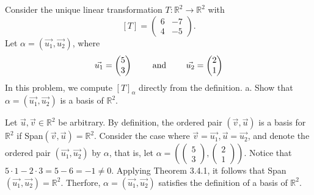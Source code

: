 \documentclass[12pt]{article}
\newenvironment{problem}[2][Problem]
{
	\begin{trivlist} 
		\item[\hskip \labelsep {\bfseries #1 #2:}]
	}
{
	\end{trivlist}
	}
\newenvironment{solution}[1][Solution]
{
	\begin{trivlist} 
		\item[\hskip \labelsep {\itshape #1:}]
	}
	{
	\end{trivlist}
}
\begin{document}
\begin{problem}{1}
Consider the unique linear transformation $T:\mathbb{R}^2 \to \mathbb{R}^2$ with
\[
[T]=\begin{pmatrix}6&-7\\4&-5\end{pmatrix}\text{.}
\]
Let $\alpha=(\vec{u_{1}},\vec{u_{2}})$, where
\[
\vec{u_{1}}=\begin{pmatrix}5\\3\end{pmatrix} \hphantom{1000} \text{ and } \hphantom{1000} \vec{u_{2}}=\begin{pmatrix}2\\1\end{pmatrix}
\]
In this problem, we compute $[T]_{\alpha}$ directly from the definition.
\noindent
\newline
\newline
a. Show that $\alpha=(\vec{u_{1}},\vec{u_{2}})$ is a basis of $\mathbb{R}^2$.
\begin{solution}
Let $\vec{u},\vec{v} \in \mathbb{R}^2$ be arbitrary.
By definition, the ordered pair $(\vec{v},\vec{u})$ is a basis for $\mathbb{R}^2$ if Span$(\vec{v},\vec{u})=\mathbb{R}^2$. Consider the case where $\vec{v}=\vec{u_{1}},\vec{u}=\vec{u_{2}}$, and denote the ordered pair $(\vec{u_{1}},\vec{u_{2}})$ by $\alpha$, that is, let $\alpha=\left( \begin{pmatrix}5\\3\end{pmatrix} ,\begin{pmatrix}2\\1\end{pmatrix} \right)$. Notice that $5\cdot 1 -2\cdot 3=5-6=-1\neq 0$. Applying Theorem 3.4.1, it follows that Span$(\vec{u_{1}},\vec{u_{2}}) =\mathbb{R}^2$. Therfore, $\alpha=(\vec{u_{1}},\vec{u_{2}})$ satisfies the definition of a basis of $\mathbb{R}^2$. 
\end{solution}


\end{problem}
\end{document}
